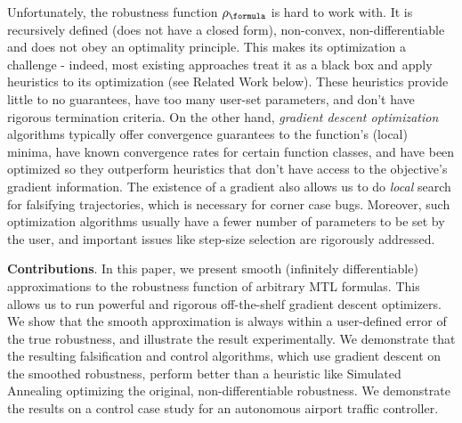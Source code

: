 Unfortunately, the robustness function $\robf$ is hard to work with.
It is recursively defined (does not have a closed form), non-convex, non-differentiable and does not obey an optimality principle.
This makes its optimization a challenge - indeed, most existing approaches treat it as a black box and apply heuristics to its optimization (see Related Work below).
These heuristics provide little to no guarantees, have too many user-set parameters, and don't have rigorous termination criteria.
On the other hand, \textit{gradient descent optimization} algorithms typically offer convergence guarantees to the function's (local) minima, have known convergence rates for certain function classes, and have been optimized so they outperform heuristics that don't have access to the objective's gradient information.
The existence of a gradient also allows us to do \textit{local} search for falsifying trajectories, which is necessary for corner case bugs.
Moreover, such optimization algorithms usually have a fewer number of parameters to be set by the user, and important issues like step-size selection are rigorously addressed.

\textbf{Contributions}. In this paper, we present smooth (infinitely differentiable) approximations to the robustness function of arbitrary MTL formulas.
This allows us to run powerful and rigorous off-the-shelf gradient descent optimizers.
We show that the smooth approximation is always within a user-defined error of the true robustness, and illustrate the result experimentally.
We demonstrate that the resulting falsification and control algorithms, which use gradient descent on the smoothed robustness, perform better than a heuristic like Simulated Annealing optimizing the original, non-differentiable robustness.
We demonstrate the results on a control case study for an autonomous airport traffic controller.

